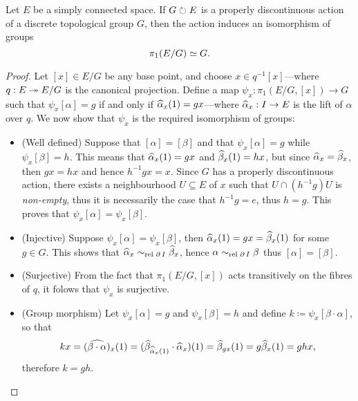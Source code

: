 \begin{proposition}
\label{prop:prop-disc-and-1-connected-simply-connected-iso-grps}
Let \(E\) be a simply connected space. If \(G \circlearrowright E\) is a properly
discontinuous action of a discrete topological group \(G\), then the action
induces an isomorphism of groups
\[
\pi_1(E/G) \simeq G.
\]
\end{proposition}

\begin{proof}
Let \([x] \in E/G\) be any base point, and choose \(x \in q^{-1}[x]\)---where
\(q: E \twoheadrightarrow E/G\) is the canonical projection. Define a map
\(\psi_x: \pi_1(E/G, [x]) \to G\) such that \(\psi_x[\alpha] = g\) if and only
if \(\widehat \alpha_x(1) = g x\)---where \(\widehat \alpha_x: I \to E\) is the lift of
\(\alpha\) over \(q\). We now show that \(\psi_x\) is the required isomorphism
of groups:
\begin{itemize}\setlength\itemsep{0em}
\item (Well defined) Suppose that \([\alpha] = [\beta]\) and that
  \(\psi_x[\alpha] = g\) while \(\psi_x[\beta] = h\). This means that
  \(\widehat \alpha_x(1) = g x\) and \(\widehat \beta_x(1) = h x\), but since
  \(\widehat \alpha_x = \widehat \beta_x\), then \(g x = h x\) and hence
  \(h^{-1} g x = x\). Since \(G\) has a properly discontinuous action, there
  exists a neighbourhood \(U \subseteq E\) of \(x\) such that
  \(U \cap (h^{-1} g) U\) is \emph{non-empty}, thus it is necessarily the case
  that \(h^{-1} g = e\), thus \(h = g\). This proves that
  \(\psi_x[\alpha] = \psi_x[\beta]\).

\item (Injective) Suppose \(\psi_x [\alpha] = \psi_x [\beta]\), then
  \(\widehat \alpha_x(1) = g x = \widehat \beta_x(1)\) for some \(g \in G\). This
  shows that \(\widehat \alpha_x \sim_{\text{rel }{\operatorname{\partial}I}} \widehat \beta_x\), hence
  \(\alpha \sim_{\text{rel }{\operatorname{\partial}I}} \beta\) thus \([\alpha] = [\beta]\).

\item (Surjective) From the fact that \(\pi_1(E/G, [x])\) acts transitively on
  the fibres of \(q\), it folows that \(\psi_x\) is surjective.

\item (Group morphism) Let \(\psi_x[\alpha] = g\) and \(\psi_x [\beta] = h\) and
  define \(k \coloneq \psi_x[\beta \cdot \alpha]\), so that
  \[
  k x = (\widehat{\beta \cdot \alpha})_x(1)
  = (\widehat \beta_{\widehat \alpha_x(1)} \cdot \widehat \alpha_x)(1)
  = \widehat \beta_{g x}(1)
  = g \widehat \beta_x(1)
  = g h x,
  \]
  therefore \(k = g h\).
\end{itemize}
\end{proof}

